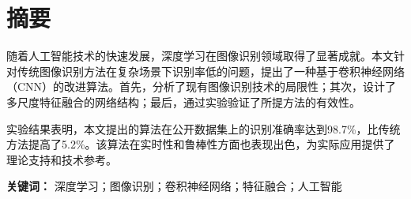 
\chapter*{摘\hspace{1em}要}

随着人工智能技术的快速发展，深度学习在图像识别领域取得了显著成就。本文针对传统图像识别方法在复杂场景下识别率低的问题，提出了一种基于卷积神经网络（CNN）的改进算法。首先，分析了现有图像识别技术的局限性；其次，设计了多尺度特征融合的网络结构；最后，通过实验验证了所提方法的有效性。

实验结果表明，本文提出的算法在公开数据集上的识别准确率达到98.7\%，比传统方法提高了5.2\%。该算法在实时性和鲁棒性方面也表现出色，为实际应用提供了理论支持和技术参考。

\vspace{1em}

\textbf{关键词：} 深度学习；图像识别；卷积神经网络；特征融合；人工智能
